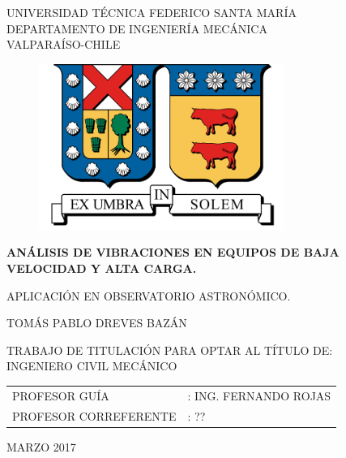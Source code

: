\begin{titlepage}
\begin{center}
\begin{Large}
UNIVERSIDAD TÉCNICA FEDERICO SANTA MARÍA\\
DEPARTAMENTO DE INGENIERÍA MECÁNICA \\
VALPARAÍSO-CHILE\\
\end{Large}
\end{center}
\vspace*{0.6in}
\begin{center}
\vspace*{-0.75in}
\begin{figure}[htb]
\begin{center}
\includegraphics[width=8cm]{pictures/escudocolor.png}
\end{center}
\end{figure}
\vspace*{0.2in}
\begin{Large}
\textbf{ANÁLISIS DE VIBRACIONES EN EQUIPOS DE BAJA VELOCIDAD Y ALTA CARGA.}\\
\end{Large}
\begin{Large}
APLICACIÓN EN OBSERVATORIO ASTRONÓMICO. \\
\end{Large}
\vspace*{0.5in}
\begin{large}
TOMÁS PABLO DREVES BAZÁN\\
\end{large}
\vspace*{0.5in}
\begin{large}
TRABAJO DE TITULACIÓN PARA OPTAR AL TÍTULO DE:\\
INGENIERO CIVIL MECÁNICO\\
\vspace*{0.5in}
\begin{table}[H]
\centering
\begin{tabular}{ll}
PROFESOR GUÍA & : ING. FERNANDO ROJAS\\
PROFESOR CORREFERENTE & : ??\\
\end{tabular}  
\end{table}
\end{large}
\vspace*{0.3in}
\begin{large}
MARZO 2017
\end{large}
\end{center}
\end{titlepage}
\newpage